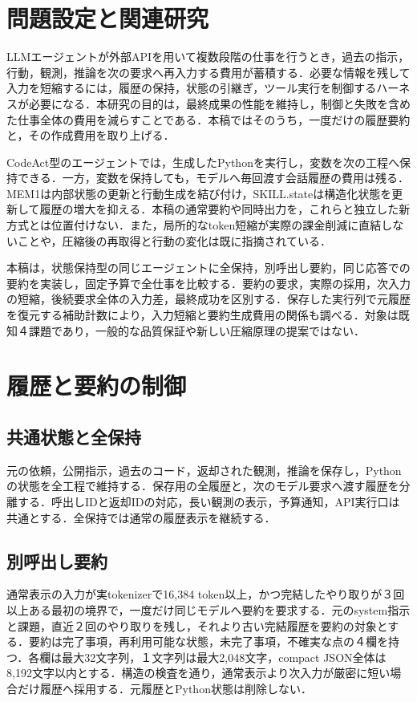 \section{問題設定と関連研究}
LLMエージェントが外部APIを用いて複数段階の仕事を行うとき，過去の指示，行動，観測，推論を次の要求へ再入力する費用が蓄積する．必要な情報を残して入力を短縮するには，履歴の保持，状態の引継ぎ，ツール実行を制御するハーネスが必要になる．本研究の目的は，最終成果の性能を維持し，制御と失敗を含めた仕事全体の費用を減らすことである．本稿ではそのうち，一度だけの履歴要約と，その作成費用を取り上げる．

CodeAct\cite{codeact}型のエージェントでは，生成したPythonを実行し，変数を次の工程へ保持できる．一方，変数を保持しても，モデルへ毎回渡す会話履歴の費用は残る．MEM1\cite{mem1}は内部状態の更新と行動生成を結び付け，SKILL.state\cite{skillstate}は構造化状態を更新して履歴の増大を抑える．本稿の通常要約や同時出力を，これらと独立した新方式とは位置付けない．また，局所的なtoken短縮が実際の課金削減に直結しないことや，圧縮後の再取得と行動の変化は既に指摘されている\cite{costproxy}．

本稿は，状態保持型の同じエージェントに全保持，別呼出し要約，同じ応答での要約を実装し，固定予算で全仕事を比較する．要約の要求，実際の採用，次入力の短縮，後続要求全体の入力差，最終成功を区別する．保存した実行列で元履歴を復元する補助計数により，入力短縮と要約生成費用の関係も調べる．対象は既知４課題であり，一般的な品質保証や新しい圧縮原理の提案ではない．

\section{履歴と要約の制御}
\subsection{共通状態と全保持}
元の依頼，公開指示，過去のコード，返却された観測，推論を保存し，Pythonの状態を全工程で維持する．保存用の全履歴と，次のモデル要求へ渡す履歴を分離する．呼出しIDと返却IDの対応，長い観測の表示，予算通知，API実行口は共通とする．全保持では通常の履歴表示を継続する．

\subsection{別呼出し要約}
通常表示の入力が実tokenizerで16,384 token以上，かつ完結したやり取りが３回以上ある最初の境界で，一度だけ同じモデルへ要約を要求する．元のsystem指示と課題，直近２回のやり取りを残し，それより古い完結履歴を要約の対象とする．要約は完了事項，再利用可能な状態，未完了事項，不確実な点の４欄を持つ．各欄は最大32文字列，１文字列は最大2,048文字，compact JSON全体は8,192文字以内とする．構造の検査を通り，通常表示より次入力が厳密に短い場合だけ履歴へ採用する．元履歴とPython状態は削除しない．

